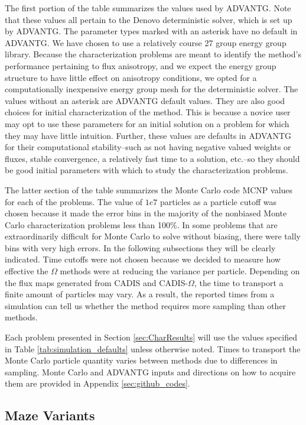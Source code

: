The first portion of the table summarizes the values used by ADVANTG. Note that
these values all pertain to the Denovo deterministic solver, which is set up by
ADVANTG. The parameter types marked with an asterisk have no default in ADVANTG.
We have chosen to use a relatively course 27 group energy group library.
Because the characterization problems are meant to identify the method's
performance pertaining to flux anisotropy, and we expect the energy group
structure to have little effect on anisotropy conditions, we opted for a
computationally inexpensive energy group mesh for the deterministic solver.
The values without an asterisk are ADVANTG default values.
They are also good choices for
initial characterization of the method. This is because a novice user may opt to
use these parameters for an initial solution on a problem for which they may have
little intuition. Further, these values are defaults in ADVANTG for their
computational stability--such as not having negative valued weights or fluxes,
stable convergence, a relatively fast time to a solution, etc.--so they should
be good initial parameters with which to study the characterization problems.

The latter section of the table summarizes the Monte Carlo code MCNP values for
each of the problems. The value of $1e7$ particles as a particle cutoff
was chosen because it made the
error bins in the majority of the nonbiased Monte Carlo
characterization problems less than 100\%. In some problems that are
extraordinarily difficult for Monte Carlo to solve without biasing, there were
tally bins with very high errors. In the following subsections they will be
clearly indicated. Time cutoffs were not chosen because
we decided to measure how effective the $\Omega$ methods were at reducing the
variance per particle. Depending on the flux maps generated from CADIS and
CADIS-$\Omega$, the time to transport a finite amount of particles may vary. As
a result, the reported times from a simulation can tell us whether the method
requires more sampling than other methods.

Each problem presented in Section \ref{sec:CharResults} will
use the values specified in Table \ref{tab:simulation_defaults}
unless otherwise noted.
Times to transport the Monte Carlo particle quantity varies between methods
due to differences in sampling. Monte Carlo and ADVANTG
inputs and directions on how to acquire them are
provided in Appendix \ref{sec:github_codes}.

\subsection{Maze Variants}
\label{subsec:resultsmaze}
